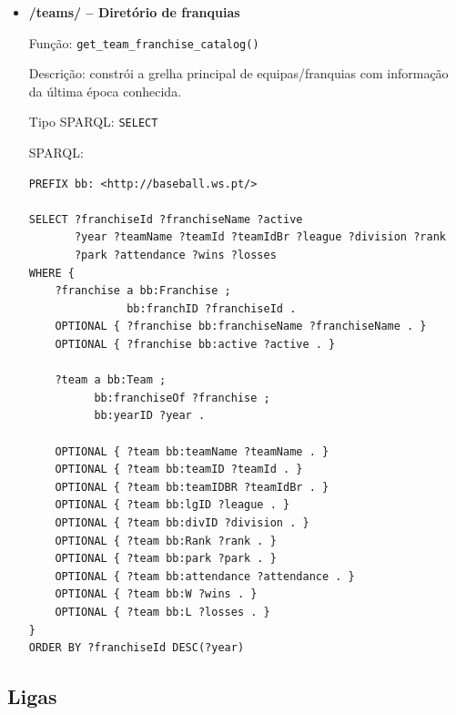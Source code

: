 \begin{itemize}[leftmargin=*]
  \item \textbf{/teams/ -- Diret\'orio de franquias}
  
  Fun\c{c}\~ao: \texttt{get\_team\_franchise\_catalog()}
  
  Descri\c{c}\~ao: constr\'oi a grelha principal de equipas/franquias com informa\c{c}\~ao da \'{u}ltima \'{e}poca conhecida.
  
  Tipo SPARQL: \texttt{SELECT}

  SPARQL:

\begin{Verbatim}[fontsize=\scriptsize,breaklines=true]
PREFIX bb: <http://baseball.ws.pt/>

SELECT ?franchiseId ?franchiseName ?active
       ?year ?teamName ?teamId ?teamIdBr ?league ?division ?rank
       ?park ?attendance ?wins ?losses
WHERE {
    ?franchise a bb:Franchise ;
               bb:franchID ?franchiseId .
    OPTIONAL { ?franchise bb:franchiseName ?franchiseName . }
    OPTIONAL { ?franchise bb:active ?active . }

    ?team a bb:Team ;
          bb:franchiseOf ?franchise ;
          bb:yearID ?year .

    OPTIONAL { ?team bb:teamName ?teamName . }
    OPTIONAL { ?team bb:teamID ?teamId . }
    OPTIONAL { ?team bb:teamIDBR ?teamIdBr . }
    OPTIONAL { ?team bb:lgID ?league . }
    OPTIONAL { ?team bb:divID ?division . }
    OPTIONAL { ?team bb:Rank ?rank . }
    OPTIONAL { ?team bb:park ?park . }
    OPTIONAL { ?team bb:attendance ?attendance . }
    OPTIONAL { ?team bb:W ?wins . }
    OPTIONAL { ?team bb:L ?losses . }
}
ORDER BY ?franchiseId DESC(?year)
\end{Verbatim}
\end{itemize}

\subsection{Ligas}

